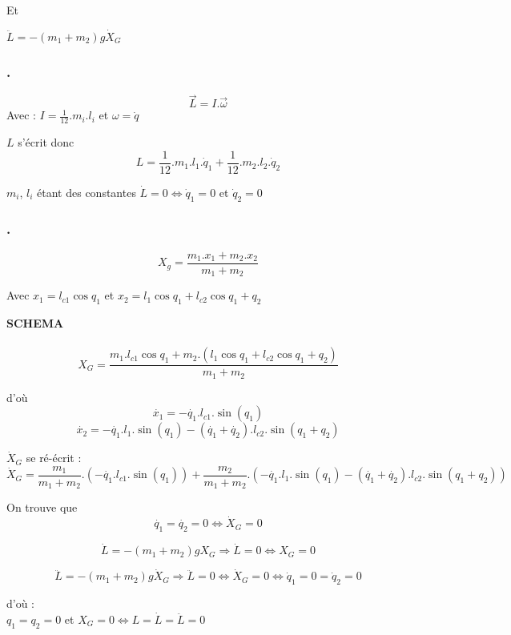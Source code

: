 \documentclass[a4paper,12pt]{report}
\begin{document}
Et

$\ddot{L} = - (m_1 + m_2)g \dot{X}_G$



\subsubsection{.}
\label{subs:}

$$\overrightarrow{L} = I.\overrightarrow{\omega}$$
Avec : $I = \frac{1}{12}.m_i.l_i$ et $\omega = \dot{q}$

$L$ s'écrit donc
$$L = \frac{1}{12}.m_1.l_1.\dot{q}_1 + \frac{1}{12}.m_2.l_2.\dot{q}_2$$

$m_i$, $l_i$ étant des constantes $\dot{L} = 0 \Leftrightarrow \dot{q}_1 = 0$ et $\dot{q}_2 = 0$


\subsubsection{.}
\label{subs:}

$$X_g = \frac{m_1.x_1 + m_2.x_2}{m_1 + m_2}$$

Avec $x_1 = l_{c1} \cos{q_1}$ et $x_2 = l_{1} \cos{q_1} + l_{c2} \cos{q_1 + q_2}$

\textbf{SCHEMA}\\\\

$$X_G = \frac{m_1.l_{c1} \cos{q_1} + m_2.(l_{1} \cos{q_1} + l_{c2} \cos{q_1 + q_2})}{m_1 + m_2}$$

d'où
$$
\dot{x_1} = - \dot{q_1}.l_{c1}.\sin(q_1)
$$
$$
\dot{x_2} = - \dot{q_1}.l_{1}.\sin(q_1) - (\dot{q_1} + \dot{q_2}).l_{c2}.\sin(q_1 + q_2)
$$

$\dot{X}_G$ se ré-écrit :
$$\dot{X}_G = \frac{m_1}{m_1 + m_2}.(- \dot{q_1}.l_{c1}.\sin(q_1)) + \frac{m_2}{m_1 + m_2}.(- \dot{q_1}.l_{1}.\sin(q_1) - (\dot{q_1} + \dot{q_2}).l_{c2}.\sin(q_1 + q_2))$$

On trouve que
$$\dot{q_1} = \dot{q_2} = 0 \Leftrightarrow \dot{X}_G = 0$$

$$
\dot{L} = - (m_1 + m_2)g X_G \Rightarrow \dot{L} = 0 \Leftrightarrow X_G = 0
$$

$$
\ddot{L} = - (m_1 + m_2)g \dot{X}_G \Rightarrow \ddot{L} = 0 \Leftrightarrow \dot{X}_G = 0 \Leftrightarrow \dot{q}_1 = 0 =\dot{q}_2 = 0
$$


d'où : \\
$q_1 = q_2 = 0$ et $X_G = 0 \Leftrightarrow L = \dot{L} = \ddot{L} = 0$
\end{document}
